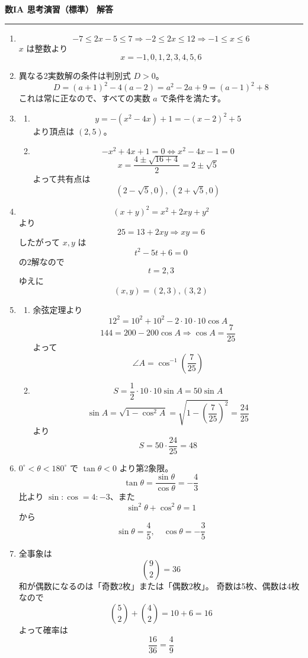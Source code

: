 \documentclass[lualatex,ja=standard]{bxjsarticle}
\begin{document}
\noindent\textbf{数IA 思考演習（標準） 解答}
\hrule
\vspace{0.8em}

\begin{enumerate}
\item
\[
-7\le 2x-5\le 7
\Rightarrow -2\le 2x\le 12
\Rightarrow -1\le x\le 6
\]
$x$ は整数より
\[
x=-1,0,1,2,3,4,5,6
\]

\item 異なる2実数解の条件は判別式 $D>0$。
\[
D=(a+1)^2-4(a-2)=a^2-2a+9=(a-1)^2+8
\]
これは常に正なので、すべての実数 $a$ で条件を満たす。

\item
\begin{enumerate}[label=(\arabic*)]
\item
\[
y=-(x^2-4x)+1=-(x-2)^2+5
\]
より頂点は $(2,5)$。
\item
\[
-x^2+4x+1=0
\Leftrightarrow x^2-4x-1=0
\]
\[
x=\frac{4\pm\sqrt{16+4}}{2}=2\pm\sqrt5
\]
よって共有点は
\[
(2-\sqrt5,0),\ (2+\sqrt5,0)
\]
\end{enumerate}

\item
\[
(x+y)^2=x^2+2xy+y^2
\]
より
\[
25=13+2xy \Rightarrow xy=6
\]
したがって $x,y$ は
\[
t^2-5t+6=0
\]
の2解なので
\[
t=2,3
\]
ゆえに
\[
(x,y)=(2,3),(3,2)
\]

\item
\begin{enumerate}[label=(\arabic*)]
\item 余弦定理より
\[
12^2=10^2+10^2-2\cdot10\cdot10\cos A
\]
\[
144=200-200\cos A
\Rightarrow \cos A=\frac{7}{25}
\]
よって
\[
\angle A=\cos^{-1}\!\left(\frac{7}{25}\right)
\]
\item
\[
S=\frac12\cdot10\cdot10\sin A=50\sin A
\]
\[
\sin A=\sqrt{1-\cos^2A}
=\sqrt{1-\left(\frac{7}{25}\right)^2}
=\frac{24}{25}
\]
より
\[
S=50\cdot\frac{24}{25}=48
\]
\end{enumerate}

\item $0^\circ<\theta<180^\circ$ で $\tan\theta<0$ より第2象限。
\[
\tan\theta=\frac{\sin\theta}{\cos\theta}=-\frac43
\]
比より $\sin:\cos=4:-3$、また
\[
\sin^2\theta+\cos^2\theta=1
\]
から
\[
\sin\theta=\frac45,\quad \cos\theta=-\frac35
\]

\item 全事象は
\[
\binom92=36
\]
和が偶数になるのは「奇数2枚」または「偶数2枚」。
奇数は5枚、偶数は4枚なので
\[
\binom52+\binom42=10+6=16
\]
よって確率は
\[
\frac{16}{36}=\frac49
\]


\end{enumerate}
\end{document}
